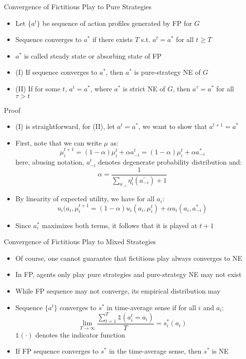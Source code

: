 \documentclass[11pt,aspectratio=169]{beamer}
\begin{document}
  
  \begin{frame}{Convergence of Fictitious Play to Pure Strategies}
   \begin{itemize}[<+->]
   \setlength{\itemsep}{1.2em}
    \item Let $\{a^t\}$ be sequence of action profiles generated by FP for $G$
    \item Sequence \alert{converges} to $a^*$ if there exists $T$ s.t. $a^t = a^*$ for all $t\ge T$
    \item $a^*$ is called \alert{steady state} or \alert{absorbing state} of FP
    \item (I) If sequence converges to $a^*$, then $a^*$ is pure-strategy NE of $G$
    \item (II) If for some $t$, $a^t = a^*$, where $a^*$ is strict NE of $G$, then $a^\tau = a^*$ for all $\tau > t$
   \end{itemize}
  \end{frame}
  
  
  \begin{frame}{Proof}
   \begin{itemize}[<+->]
    \item (I) is straightforward, for (II), let $a^t = a^*$, we want to show that $a^{t+1} = a^*$
    \item First, note that we can write $\mu$ as: 
    $$\mu_i^{t+1} = (1-\alpha)\mu_i^t + \alpha a_{-i}^t = (1-\alpha)\mu_i^t + \alpha a^*_{-i}$$
    here, abusing notation, $a_{-i}^t$ denotes degenerate probability distribution and:
    $$\alpha = \frac{1}{\sum_{a_{-i}^\prime}\eta_i^t(a_{-i}^\prime)+1}$$
    \item By linearity of expected utility, we have for all $a_i$:
    $$u_i(a_i,\mu_i^{t+1} = (1-\alpha)u_i(a_i,\mu_i^t)+\alpha u_i(a_i,a_{-i}^*)$$
    \item Since $a_i^*$ maximizes both terms, it follows that it is played at $t+1$
   \end{itemize}
  \end{frame}
  
  
  \begin{frame}{Convergence of Fictitious Play to Mixed Strategies}
   \begin{itemize}[<+->]
   \setlength{\itemsep}{0.7em}
    \item Of course, one cannot guarantee that fictitious play always converges to NE
    \item In FP, agents only play pure strategies and pure-strategy NE may not exist
    \item While FP sequence may not converge, its empirical distribution may
    \item Sequence $\{a^t\}$ converges to $s^*$ in time-average sense if for all $i$ and $a_i$:
    $$\lim_{T\to\infty}\frac{\sum_{t=1}^{T}\mathds{1}(a_i^t=a_i)}{T} = s^*_i(a_i)$$
    $\mathds{1}(\cdot)$ denotes the indicator function
    \item If FP sequence converges to $s^*$ in the time-average sense, then $s^*$ is NE
   \end{itemize}
  \end{frame}
  
\end{document}
